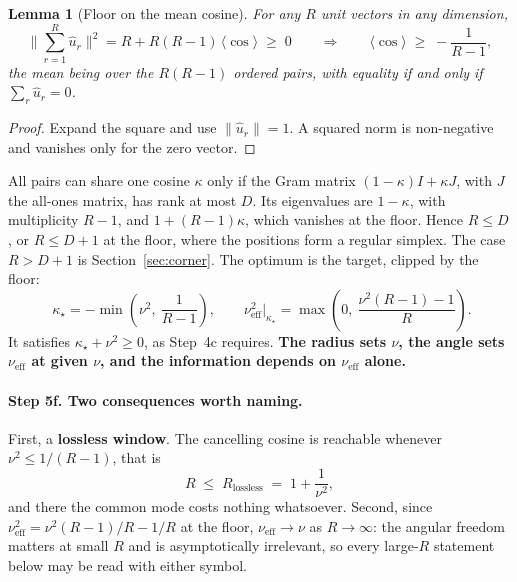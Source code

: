 \documentclass[11pt,a4paper]{article}
\newtheorem{lemma}{Lemma}
\newcommand{\uhat}{\hat{u}}
\newcommand{\nueff}{\nu_{\mathrm{eff}}}
\begin{document}
\begin{lemma}[Floor on the mean cosine]
\label{lem:cosfloor}
For any $R$ unit vectors in any dimension,
\begin{equation}
  \Big\|\sum_{r=1}^R\uhat_r\Big\|^2 = R + R(R-1)\,\langle\cos\rangle \;\ge\; 0
  \qquad\Longrightarrow\qquad
  \langle\cos\rangle \;\ge\; -\frac{1}{R-1},
  \label{eq:cosfloor}
\end{equation}
the mean being over the $R(R-1)$ ordered pairs, with equality if and only if
$\sum_r\uhat_r=0$.
\end{lemma}

\begin{proof}
Expand the square and use $\|\uhat_r\|=1$. A squared norm is non-negative and vanishes
only for the zero vector.
\end{proof}

All pairs can share one cosine $\kappa$ only if the Gram matrix $(1-\kappa)I+\kappa J$,
with $J$ the all-ones matrix, has rank at most $D$. Its eigenvalues are $1-\kappa$, with
multiplicity $R-1$, and $1+(R-1)\kappa$, which vanishes at the floor. Hence $R\le D$, or
$R\le D+1$ at the floor, where the positions form a regular simplex. The case $R>D+1$ is
Section~\ref{sec:corner}. The optimum is the target, clipped by the floor:
\begin{equation}
  \boxed{\;\kappa_\star = -\min\!\left(\nu^2,\ \frac{1}{R-1}\right),
  \qquad
  \nueff^2\big|_{\kappa_\star} = \max\!\left(0,\ \frac{\nu^2(R-1)-1}{R}\right).}
  \label{eq:cosopt}
\end{equation}
It satisfies $\kappa_\star+\nu^2\ge0$, as Step~4c requires. \textbf{The radius sets $\nu$,
the angle sets $\nueff$ at given $\nu$, and the information depends on $\nueff$ alone.}

\paragraph{Step 5f. Two consequences worth naming.} First, a \textbf{lossless window}. The
cancelling cosine is reachable whenever $\nu^2\le1/(R-1)$, that is
\begin{equation}
  R \;\le\; R_{\mathrm{lossless}} \;=\; 1+\frac{1}{\nu^2},
  \label{eq:rlossless}
\end{equation}
and there the common mode costs nothing whatsoever. Second, since
$\nueff^2 = \nu^2(R-1)/R - 1/R$ at the floor, $\nueff\to\nu$ as $R\to\infty$: the angular
freedom matters at small $R$ and is asymptotically irrelevant, so every large-$R$ statement
below may be read with either symbol.
\end{document}
